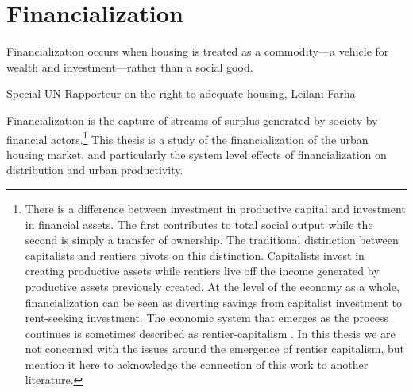 \chapter{Financialization} \label{chapter-financialization}
\epigraph{Financialization occurs when housing is treated as a commodity---a vehicle for wealth and investment---rather than a social good.}{Special UN Rapporteur on the right to adequate housing, Leilani Farha \cite{farhaReportFinancializationHousing2017}}

Financialization is the capture  of streams of surplus generated by society by financial actors.\footnote{There is a difference between investment in productive capital and investment in financial assets. The first contributes to total social output while the second is simply a transfer of ownership. The traditional distinction between capitalists and \glspl{rentier} pivots on this distinction. Capitalists invest in creating productive assets while rentiers live off the income generated by productive assets previously created. At the level of the economy as a whole, financialization can be seen as diverting savings from capitalist investment to rent-seeking investment. The economic system  that emerges as the process continues is sometimes described as rentier-capitalism \cite{christophersClassAssetsWork2021,  standingCorruptionCapitalismWhy2017}. In this thesis we are not concerned with the issues around the emergence of rentier capitalism, but mention it here to acknowledge the connection of this work to another literature.} 
This thesis is a study of the \gls{financialization} of the urban housing market, and particularly the system level effects of financialization on distribution and urban productivity. 


